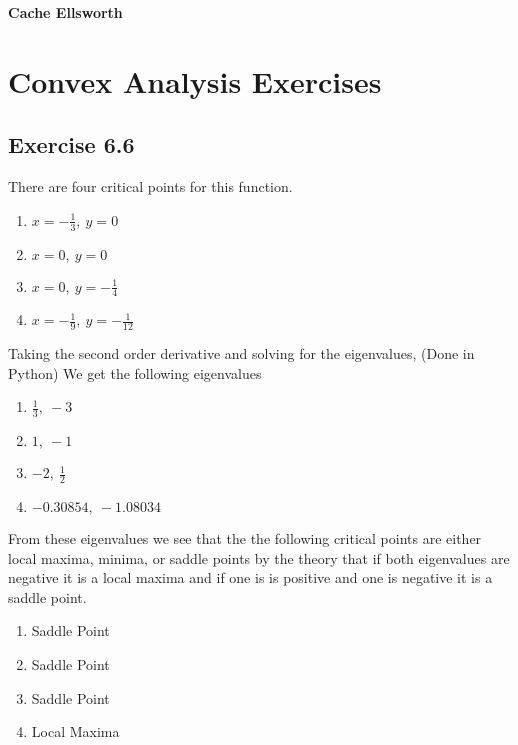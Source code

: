 \documentclass[11.5pt, letterpaper, bibtotoc,
    tablecaptionabove, figurecaptionabove]{article}
\begin{document}
\textbf{Cache Ellsworth}

\section*{Convex Analysis Exercises}

\subsection*{Exercise 6.6 }
There are four critical points for this function.  
\begin{enumerate}
	\item $x = -\frac{1}{3}, \: y=0$
	\item $x = 0, \: y=0$
	\item $x = 0, \: y=- \frac{1}{4}$
	\item $x = -\frac{1}{9}, \: y=-\frac{1}{12}$
\end{enumerate}
Taking the second order derivative and solving for the eigenvalues, (Done in Python) We get the following eigenvalues
\begin{enumerate}
	\item $\frac{1}{3}, \: -3$
	\item $1, \: -1$
	\item $-2,\: \frac{1}{2}$
	\item $-0.30854,\: -1.08034$
\end{enumerate}
From these eigenvalues we see that the the following critical points are either local maxima, minima, or saddle points by the theory that if both eigenvalues are negative it is a local maxima and if one is is positive and one is negative it is a saddle point.
\begin{enumerate}
	\item Saddle Point
	\item Saddle Point
	\item Saddle Point
	\item Local Maxima
\end{enumerate}
\end{document}
